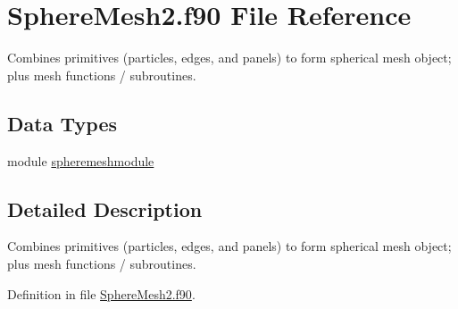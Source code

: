 \hypertarget{_sphere_mesh2_8f90}{\section{Sphere\+Mesh2.\+f90 File Reference}
\label{_sphere_mesh2_8f90}
}


Combines primitives (particles, edges, and panels) to form spherical mesh object; plus mesh functions / subroutines.  


\subsection*{Data Types}
\begin{DoxyCompactItemize}
\item 
module \hyperlink{classspheremeshmodule}{spheremeshmodule}
\end{DoxyCompactItemize}


\subsection{Detailed Description}
Combines primitives (particles, edges, and panels) to form spherical mesh object; plus mesh functions / subroutines. 



Definition in file \hyperlink{_sphere_mesh2_8f90_source}{Sphere\+Mesh2.\+f90}.

